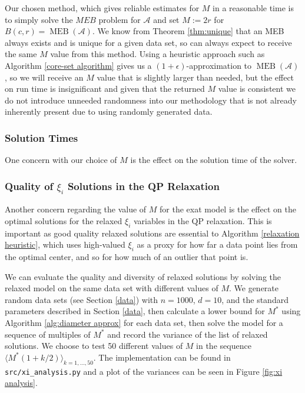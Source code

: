 \documentclass[11pt,twoside]{report}
\newcommand{\A}{\mathcal{A}} %
\DeclareMathOperator{\MEB}{MEB}
\theoremstyle{definition}
\numberwithin{theorem}{section}
\numberwithin{definition}{section}
\numberwithin{lemma}{section}
\numberwithin{proposition}{section}
\numberwithin{equation}{section}
\numberwithin{figure}{section}
\begin{document}
Our chosen method, which gives reliable estimates for $M$ in a reasonable time is to simply solve the $MEB$ problem for $\A$ and set $M:=2r$ for $B(c,r)=\MEB(\A)$. We know from Theorem \ref{thm:unique} that an MEB always exists and is unique for a given data set, so can always expect to receive the same $M$ value from this method. Using a heuristic approach such as Algorithm \ref{core-set algorithm} gives us a $(1+\epsilon)$-approximation to $\MEB(\A)$, so we will receive an $M$ value that is slightly larger than needed, but the effect on run time is insignificant and given that the returned $M$ value is consistent we do not introduce unneeded randomness into our methodology that is not already inherently present due to using randomly generated data.

\subsubsection{Solution Times} %
One concern with our choice of $M$ is the effect on the solution time of the solver.

\subsubsection{Quality of $\xi_i$ Solutions in the QP Relaxation}
Another concern regarding the value of $M$ for the exat model is the effect on the optimal solutions for the relaxed $\xi_i$ variables in the QP relaxation. This is important as good quality relaxed solutions are essential to Algorithm \ref{relaxation heuristic}, which uses high-valued $\xi_i$ as a proxy for how far a data point lies from the optimal center, and so for how much of an outlier that point is.

We can evaluate the quality and diversity of relaxed solutions by solving the relaxed model on the same data set with different values of $M$. We generate random data sets (see Section \ref{data}) with $n=1000$, $d=10$, and the standard parameters described in Section \ref{data}, then calculate a lower bound for $M^*$ using Algorithm \ref{alg:diameter approx} for each data set, then solve the model for a sequence of multiples of $M^*$ and record the variance of the list of relaxed solutions. We choose to test 50 different values of $M$ in the sequence $\langle M^*(1+k/2)\rangle _{k=1,\ldots,50}$. The implementation can be found in \texttt{src/xi\_analysis.py} and a plot of the variances can be seen in Figure \ref{fig:xi analysis}.
\end{document}
